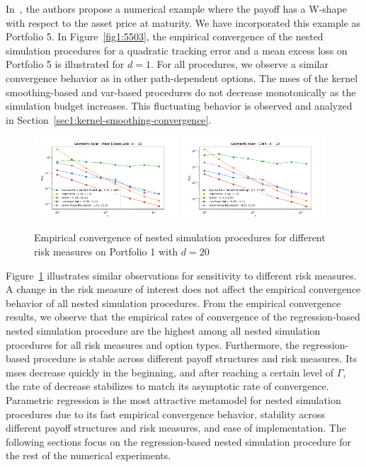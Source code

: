 In~\cite{broadie2015risk}, the authors propose a numerical example where the payoff has a W-shape with respect to the asset price at maturity.
We have incorporated this example as Portfolio 5.
In Figure~\ref{fig1:5503}, the empirical convergence of the nested simulation procedures for a quadratic tracking error and a mean excess loss on Portfolio 5 is illustrated for $d = 1$.
For all procedures, we observe a similar convergence behavior as in other path-dependent options.
The \gls{mse}s of the kernel smoothing-based and \gls{var}-based procedures do not decrease monotonically as the simulation budget increases.
This fluctuating behavior is observed and analyzed in Section~\ref{sec1:kernel-smoothing-convergence}.

\begin{figure}[ht!] 
    \centering
    \includegraphics[width=0.48\textwidth]{./project1/figures/figure8a.png}
    \includegraphics[width=0.48\textwidth]{./project1/figures/figure8b.png}
    \caption{Empirical convergence of nested simulation procedures for different risk measures on Portfolio 1 with $d=20$}
\label{fig1:110x}
\end{figure}

Figure~\ref{fig1:110x} illustrates similar observations for sensitivity to different risk measures.
A change in the risk measure of interest does not affect the empirical convergence behavior of all nested simulation procedures.
From the empirical convergence results, we observe that the empirical rates of convergence of the regression-based nested simulation procedure are the highest among all nested simulation procedures for all risk measures and option types.
Furthermore, the regression-based procedure is stable across different payoff structures and risk measures. 
Its \gls{mse}s decrease quickly in the beginning, and after reaching a certain level of $\Gamma$, the rate of decrease stabilizes to match its asymptotic rate of convergence.
Parametric regression is the most attractive metamodel for nested simulation procedures due to its fast empirical convergence behavior, stability across different payoff structures and risk measures, and ease of implementation.
The following sections focus on the regression-based nested simulation procedure for the rest of the numerical experiments.

